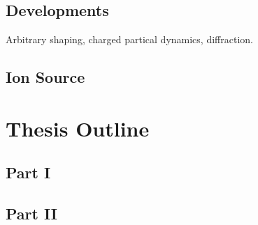 \subsection{Developments}

Arbitrary shaping, charged partical dynamics, diffraction.
\subsection{Ion Source}

\section{Thesis Outline}

\subsection{Part I}

\subsection{Part II}
